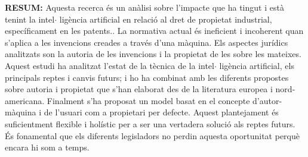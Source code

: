 \documentclass[12pt]{article}
\begin{document}
\vspace{\baselineskip}

\vspace{\baselineskip}

\vspace{\baselineskip}

\vspace{\baselineskip}

\vspace{\baselineskip}
\begin{justify}
\textbf{RESUM: }Aquesta recerca és un anàlisi sobre l’impacte que ha tingut i està tenint la intel$ \cdot $ ligència artificial en relació al dret de propietat industrial, específicament en les patents.. La normativa actual és ineficient i incoherent quan s’aplica a les invencions creades a través d’una màquina. Els aspectes jurídics analitzats son la autoria de les invencions i la propietat de les sobre les mateixes. Aquest estudi ha analitzat l’estat de la tècnica de la intel$ \cdot $ ligència artificial, els principals reptes i canvis futurs; i ho ha combinat amb les diferents propostes sobre autoria i propietat que s’han elaborat des de la literatura europea i nord-americana. Finalment s’ha proposat un model basat en el concepte d’autor-màquina i de l’usuari com a propietari per defecte. Aquest plantejament és suficientment flexible i holístic per a ser una vertadera solució als reptes futurs. És fonamental que els diferents legisladors no perdin aquesta oportunitat perquè encara hi som a temps. 
\end{justify}\par


\vspace{\baselineskip}
\par


\vspace{\baselineskip}

\vspace{\baselineskip}

\vspace{\baselineskip}
\end{document}
